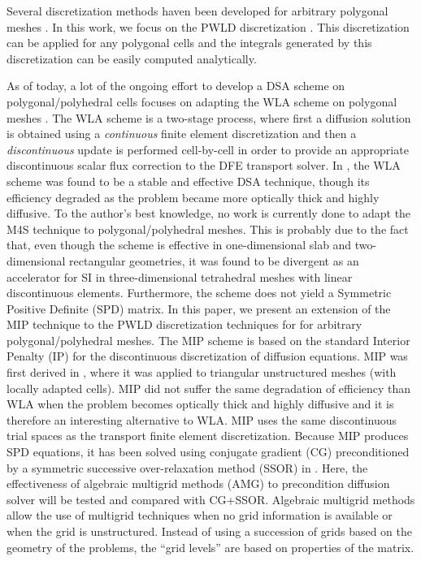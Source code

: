 Several discretization methods haven been developed for 
arbitrary polygonal meshes \cite{pwld_3d,pwl_diffusion,pwbld,palmer_fe,mimetic,
cell_centered_diff,palmer_proc,palmer_ane,pwld_2d,wachspress,cfm_dfm}.
In this work, we focus on the PWLD discretization \cite{pwld_3d,pwld_2d}. This
discretization can be applied for any polygonal cells and the integrals
generated by this discretization can be easily computed analytically. 

As of today, a lot of the ongoing effort to develop a DSA scheme on
polygonal/polyhedral cells focuses on adapting the WLA scheme on polygonal meshes
\cite{wla_pwl,cfm_dfm}. The WLA scheme is a two-stage process, where first a
diffusion solution is obtained using a {\em continuous} finite element
discretization and then a {\em discontinuous } update is performed cell-by-cell 
in order to provide an appropriate discontinuous scalar flux correction to 
the DFE transport solver. In \cite{consistent_p1}, the WLA scheme was
found to be a stable and effective DSA technique, though its efficiency
degraded as the problem became more optically thick and highly diffusive.
To the author's best knowledge, no work is currently done to adapt the M4S 
technique to polygonal/polyhedral meshes. This is probably due to the fact
that, even though the scheme is effective in one-dimensional slab and
two-dimensional rectangular geometries, it was found to be divergent as an
accelerator for SI in
three-dimensional tetrahedral meshes with linear discontinuous elements.
Furthermore, the scheme does not yield a Symmetric Positive Definite (SPD)
matrix. In this paper, we present an extension of the MIP technique to the
PWLD discretization techniques for for arbitrary polygonal/polyhedral meshes.
The MIP scheme is based on the standard Interior Penalty (IP) for the
discontinuous discretization of diffusion equations. MIP was first derived in
\cite{mip}, where it was applied to triangular unstructured meshes (with
locally adapted cells). MIP did not suffer the same degradation of efficiency 
than WLA when the problem becomes optically thick and highly diffusive and it 
is therefore an interesting alternative to WLA. MIP uses the same
discontinuous trial spaces as the transport finite element discretization.
Because MIP produces SPD equations, it has been solved using conjugate gradient 
(CG) preconditioned by
a symmetric successive over-relaxation method (SSOR) in \cite{mip}. Here, the
effectiveness of algebraic multigrid methods (AMG) to precondition diffusion
solver \cite{amg,amg_course} will be tested and compared with CG+SSOR.
Algebraic multigrid methods allow the use of multigrid techniques when no grid
information is available or when the grid is unstructured. Instead of using a
succession of grids based on the geometry of the problems, the ``grid levels''
are based on properties of the matrix.

